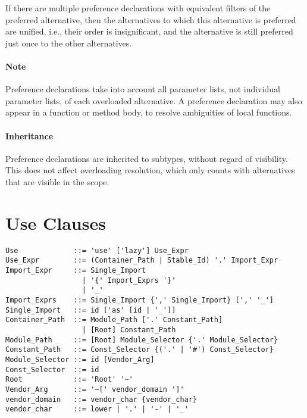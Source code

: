 If there are multiple preference declarations with equivalent filters of the preferred alternative, then the alternatives to which this alternative is preferred are unified, i.e., their order is insignificant, and the alternative is still preferred just once to the other alternatives. 

\paragraph{Note}
Preference declarations take into account all parameter lists, not individual parameter lists, of each overloaded alternative. A preference declaration may also appear in a function or method body, to resolve ambiguities of local functions. 

\paragraph{Inheritance}
Preference declarations are inherited to subtypes, without regard of visibility. This does not affect overloading resolution, which only counts with alternatives that are visible in the scope. 








\section{Use Clauses}
\label{sec:use-clauses}

\syntax\begin{lstlisting}
Use             ::= 'use' ['lazy'] Use_Expr
Use_Expr        ::= (Container_Path | Stable_Id) '.' Import_Expr
Import_Expr     ::= Single_Import
                  | '{' Import_Exprs '}'
                  | '_'
Import_Exprs    ::= Single_Import {',' Single_Import} [',' '_']
Single_Import   ::= id ['as' [id | '_']]
Container_Path  ::= Module_Path ['.' Constant_Path]
                  | [Root] Constant_Path
Module_Path     ::= [Root] Module_Selector {'.' Module_Selector}
Constant_Path   ::= Const_Selector {('.' | '#') Const_Selector}
Module_Selector ::= id [Vendor_Arg]
Const_Selector  ::= id
Root            ::= 'Root' '~'
Vendor_Arg      ::= '~[' vendor_domain ']'
vendor_domain   ::= vendor_char {vendor_char}
vendor_char     ::= lower | '.' | '-' | '_'
\end{lstlisting}

